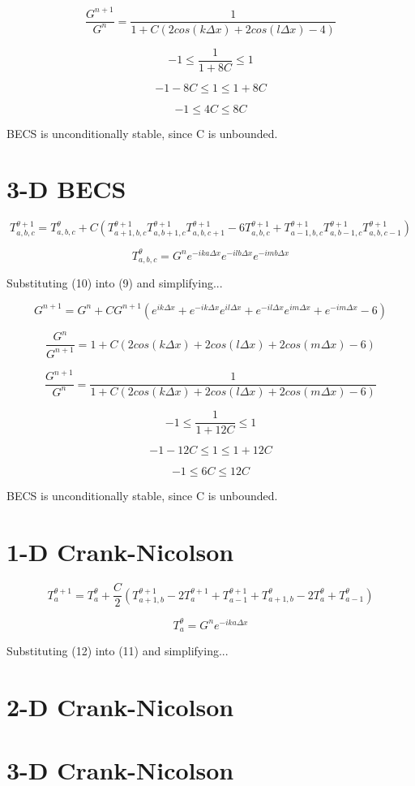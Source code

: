 \documentclass[a4paper,12pt]{article}
\begin{document}
\[
\frac{G^{n+1}}{G^n} = \frac{1}{1 + C
\left(
2cos(k \Delta x) + 2cos(l \Delta x) -  4
\right)}
\]

\[
-1 \leq \frac{1}{1 + 8C} \leq 1
\]

\[
-1-8C \leq 1 \leq 1+8C
\]

\[
-1 \leq 4C \leq 8C
\]

BECS is unconditionally stable, since C is unbounded.

\pagebreak
\section{3-D BECS}

\begin{equation}
T_{a,b,c}^{\theta+1} = T_{a,b,c}^{\theta} + C \left(
T_{a+1,b,c}^{\theta+1}
T_{a,b+1,c}^{\theta+1}
T_{a,b,c+1}^{\theta+1}
- 6T_{a,b,c}^{\theta+1}
+ T_{a-1,b,c}^{\theta+1}
T_{a,b-1,c}^{\theta+1}
T_{a,b,c-1}^{\theta+1}
\right)
\end{equation}

\begin{equation}
T_{a,b,c}^{\theta} = G^n e^{-ika\Delta x} e^{-ilb\Delta x}e^{-imb\Delta x}
\end{equation}

Substituting (10) into (9) and simplifying...

\[
G^{n+1} = G^n + C G^{n+1}
\left(
e^{ik\Delta x} + e^{-ik\Delta x}
e^{il\Delta x} + e^{-il\Delta x}
e^{im\Delta x} + e^{-im\Delta x}
- 6
\right)
\]

\[
\frac{G^n}{G^{n+1}} = 1 + C
\left(
2cos(k \Delta x) + 2cos(l \Delta x) + 2cos(m \Delta x) - 6
\right)
\]

\[
\frac{G^{n+1}}{G^n} = \frac{1}{1 + C
\left(
2cos(k \Delta x) + 2cos(l \Delta x) + 2cos(m \Delta x) -  6
\right)}
\]

\[
-1 \leq \frac{1}{1 + 12C} \leq 1
\]

\[
-1-12C \leq 1 \leq 1+12C
\]

\[
-1 \leq 6C \leq 12C
\]

BECS is unconditionally stable, since C is unbounded.

\pagebreak
\section{1-D Crank-Nicolson}

\begin{equation}
T_{a}^{\theta+1} = T_{a}^{\theta} + \frac{C}{2} \left(
T_{a+1,b}^{\theta+1}
- 2T_{a}^{\theta+1}
+ T_{a-1}^{\theta+1}
+ T_{a+1,b}^{\theta}
- 2T_{a}^{\theta}
+ T_{a-1}^{\theta}
\right)
\end{equation}

\begin{equation}
T_{a}^{\theta} = G^n e^{-ika\Delta x}
\end{equation}

Substituting (12) into (11) and simplifying...

\section{2-D Crank-Nicolson}

\section{3-D Crank-Nicolson}
\end{document}

